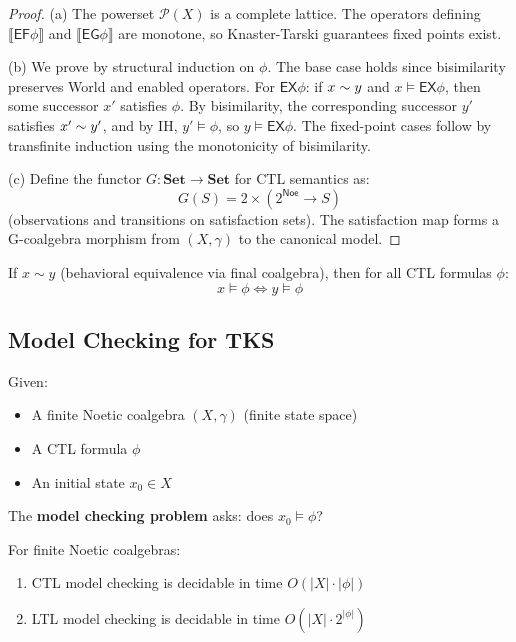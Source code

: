 \begin{proof}
(a) The powerset $\mathcal{P}(X)$ is a complete lattice. The operators defining
$\llbracket \mathsf{EF}\phi \rrbracket$ and $\llbracket \mathsf{EG}\phi \rrbracket$
are monotone, so Knaster-Tarski guarantees fixed points exist.

(b) We prove by structural induction on $\phi$. The base case holds since
bisimilarity preserves World and enabled operators. For $\mathsf{EX}\phi$: if
$x \sim y$ and $x \models \mathsf{EX}\phi$, then some successor $x'$ satisfies $\phi$.
By bisimilarity, the corresponding successor $y'$ satisfies $x' \sim y'$, and by IH,
$y' \models \phi$, so $y \models \mathsf{EX}\phi$. The fixed-point cases follow by
transfinite induction using the monotonicity of bisimilarity.

(c) Define the functor $G : \mathbf{Set} \to \mathbf{Set}$ for CTL semantics as:
\[
  G(S) = 2 \times (2^{\mathsf{Noe}} \to S)
\]
(observations and transitions on satisfaction sets). The satisfaction map forms
a G-coalgebra morphism from $(X, \gamma)$ to the canonical model.
\end{proof}

\begin{corollary}
\label{cor:behavioral-temporal}
If $x \sim y$ (behavioral equivalence via final coalgebra), then for all CTL
formulas $\phi$:
\[
  x \models \phi \iff y \models \phi
\]
\end{corollary}

\subsection{Model Checking for TKS}
\label{subsec:model-checking}

\begin{definition}
\label{def:tks-model-checking}
Given:
\begin{itemize}
  \item A finite Noetic coalgebra $(X, \gamma)$ (finite state space)
  \item A CTL formula $\phi$
  \item An initial state $x_0 \in X$
\end{itemize}
The \textbf{model checking problem} asks: does $x_0 \models \phi$?
\end{definition}

\begin{theorem}
\label{thm:model-checking-complexity}
For finite Noetic coalgebras:
\begin{enumerate}[label=(\alph*)]
  \item CTL model checking is decidable in time $O(|X| \cdot |\phi|)$
  \item LTL model checking is decidable in time $O(|X| \cdot 2^{|\phi|})$
\end{enumerate}
\end{theorem}

